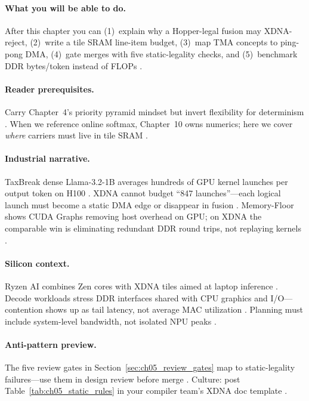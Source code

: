 \paragraph{What you will be able to do.}
After this chapter you can (1)~explain why a Hopper-legal fusion may XDNA-reject, (2)~write a tile SRAM line-item budget, (3)~map TMA concepts to ping-pong DMA, (4)~gate merges with five static-legality checks, and (5)~benchmark DDR bytes/token instead of FLOPs \citep{yirage2026,patel2025llminference}.

\paragraph{Reader prerequisites.}
Carry Chapter~4's priority pyramid mindset but invert flexibility for determinism \citep{memoryfloor2026}.
When we reference online softmax, Chapter~10 owns numerics; here we cover \emph{where} carriers must live in tile SRAM \citep{dao2022flashattention}.

\paragraph{Industrial narrative.}
TaxBreak dense Llama-3.2-1B averages hundreds of GPU kernel launches per output token on H100 \citep{taxbreak2026}.
XDNA cannot budget ``847 launches''---each logical launch must become a static DMA edge or disappear in fusion \citep{amd2024xdna,yirage2026}.
Memory-Floor shows CUDA Graphs removing host overhead on GPU; on XDNA the comparable win is eliminating redundant DDR round trips, not replaying kernels \citep{memoryfloor2026,nvidia2024cudagraphs}.

\paragraph{Silicon context.}
Ryzen AI combines Zen cores with XDNA tiles aimed at laptop inference \citep{amd2024xdna,amd2024aie}.
Decode workloads stress DDR interfaces shared with CPU graphics and I/O---contention shows up as tail latency, not average MAC utilization \citep{patel2025llminference,dlbook}.
Planning must include system-level bandwidth, not isolated NPU peaks \citep{yirage2026,memoryfloor2026}.

\paragraph{Anti-pattern preview.}
The five review gates in Section~\ref{sec:ch05_review_gates} map to static-legality failures---use them in design review before merge \citep{yirage2026,amd2024aie}.
Culture: post Table~\ref{tab:ch05_static_rules} in your compiler team's XDNA doc template \citep{chen2020compilerbasedhardw}.


